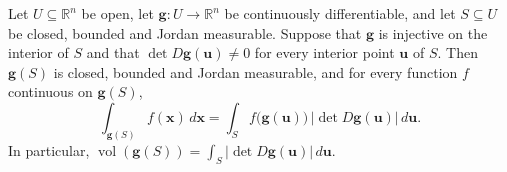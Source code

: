 \begin{theorem}
\label{thm:change-variables}
Let $U\subseteq\mathbb R^n$ be open, let $\mathbf g\colon U\to\mathbb R^n$ be continuously differentiable, and let $S\subseteq U$ be closed, bounded and Jordan measurable. Suppose that $\mathbf g$ is injective on the interior of $S$ and that $\det D\mathbf g(\mathbf u)\ne0$ for every interior point $\mathbf u$ of $S$. Then $\mathbf g(S)$ is closed, bounded and Jordan measurable, and for every function $f$ continuous on $\mathbf g(S)$,
\[
\int_{\mathbf g(S)}f(\mathbf x)\,d\mathbf x=\int_Sf\bigl(\mathbf g(\mathbf u)\bigr)\,\bigl|\det D\mathbf g(\mathbf u)\bigr|\,d\mathbf u .
\]
In particular, $\operatorname{vol}(\mathbf g(S))=\int_S|\det D\mathbf g(\mathbf u)|\,d\mathbf u$.
\end{theorem}

